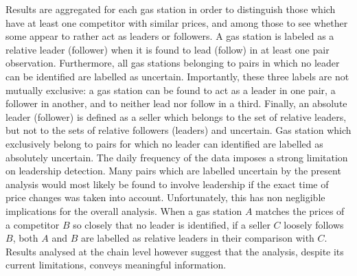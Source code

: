 \documentclass[english]{article}
\begin{document}
Results are aggregated for each gas station in order to distinguish those which have at least one competitor with similar prices, and among those to see whether some appear to rather act as leaders or followers. A gas station is labeled as a relative leader (follower) when it is found to lead (follow) in at least one pair observation. Furthermore, all gas stations belonging to pairs in which no leader can be identified are labelled as uncertain. Importantly, these three labels are not mutually exclusive: a gas station can be found to act as a leader in one pair, a follower in another, and to neither lead nor follow in a third. Finally, an absolute leader (follower) is defined as a seller which belongs to the set of relative leaders, but not to the sets of relative followers (leaders) and uncertain. Gas station which exclusively belong to pairs for which no leader can identified are labelled as absolutely uncertain. The daily frequency of the data imposes a strong limitation on leadership detection. Many pairs which are labelled uncertain by the present analysis would most likely be found to involve leadership if the exact time of price changes was taken into account. Unfortunately, this has non negligible implications for the overall analysis. When a gas station $A$ matches the prices of a competitor $B$ so closely that no leader is identified, if a seller $C$ loosely follows $B$, both $A$ and $B$ are labelled as relative leaders in their comparison with $C$. Results analysed at the chain level however suggest that the analysis, despite its current limitations, conveys meaningful information.
\end{document}
